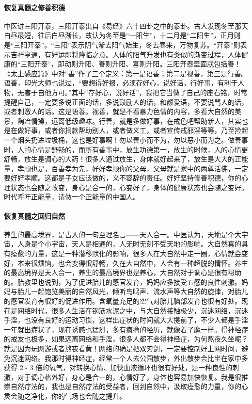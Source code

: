 \documentclass{ctexart}
\begin{document}
\paragraph{恢复真髓之修善积德}

中医讲三阳开泰，三阳开泰出自《易经》六十四卦之中的泰卦。古人发现冬至那天白昼最短，往后白昼渐长，故认为冬至是“一阳生”，十二月是“二阳生”，正月则是“三阳开泰”。“三阳”表示阴气渐去阳气始生，冬去春来，万物复苏。“开泰”则表示吉祥亨通，有好运即将降临之意。人体的阳气升发也有类似的渐变过程，人体健康的“三阳开泰”，即动则升阳、善则升阳、喜则升阳。三阳开泰里面就包括善！《太上感应篇》中对“善”作了三个定义：第一是语善；第二是视善，第三是行善。语善，印光大师也说过，“要想得好报，必须存好心，说好话，行好事，有利于人物，无害于自他方可。”其中“存好心，说好话”，我把它当做了自己的座右铭，时常提醒自己，一定要多说正面的话，多说鼓励人的话，和颜爱语，不要说骂人的话，或者刺激人的话。这是语善。视善，就是不看暴力色情的内容，多看大自然的美景，陶冶情操，远离低级趣味。行善，就是多做好事，在戒色吧帮助新人，其实也是在做好事，或者你捐款帮助别人，或者做义工，或者宣传戒邪淫等等，乃至捡起一个烟头扔进垃圾桶，这也是好事啊！勿以善小而不为，勿以恶小而为之。做善事时，人的心情是舒畅的，而所有善事中，放生功德第一，放生的时候，人的心情更舒畅，放生是调心的大药！很多人通过放生，身体就好起来了，放生是大大的正能量，孝顺也是，百善孝为先，好好孝顺你的父母，父母就是家中的两尊活佛，一定要好好孝顺。这都是子女应该做的，义不容辞的责任。好好坚持修善积德，你的心理状态也会随之改变，身心是合一的，心变好了，身体的健康状态也会随之变好。时代呼吁正能量，请做一个正能量的中国人。

\paragraph{恢复真髓之回归自然}

养生的最高境界，是古人的一句至理名言——天人合一。中医认为，天地是个大宇宙，人身是个小宇宙，天人是相通的，人无时无刻不受天地的影响。大自然真的具有痊愈的力量，这是一种潜移默化的影响，很多人在大自然中走一圈，心情就会变好，本来很烦恼，也会变得很舒畅，久在大自然中，人会有一种超脱的情怀。养生的最高境界是天人合一，养生的最高境界也是养心，大自然对于调心是很有帮助的。胎教里也说到，为了促进胎儿的感官发育，妈妈应多接受五感的良性刺激。妈妈与胎儿一起饱览美丽的自然风光，倾听鸟鸣声、流水声等大自然的旋律，对胎儿的感官发育有很好的促进作用。含氧量充足的空气对胎儿脑部发育也很有好处。现在是网络时代，很多人生活在钢筋水泥之中，与大自然接触极少，沉迷网络，沉迷手淫，也没有良好的运动习惯，这样出症状的时间就大大提前了，不少人都是手淫一年就出症状了，现在诱惑也猛烈，多有疯撸的经历，就像着了魔一样。得神经症的戒友也极多，如果远离网络和手淫，很多人都不会得神经症，为何熬夜久坐呢？就是因为玩网游或者熬夜看黄！网络的确是把双刃剑，一定要控制好上网时间，避免沉迷网络。我那时得神经症，经常一个人去公园散步，外出散步会比坐在家中多获得 2 - 3 倍的氧气，对转换心情、加快血液循环也很有好处，是一种良性的刺激，对于调心格外好，身心是合一的，心情好了，身体也容易加快恢复。我是很推崇自然疗法的，我也是自然疗法的受益者，回到自然中，汲取痊愈的力量，你的心灵会随之净化，你的气场也会随之提升。
\end{document}
